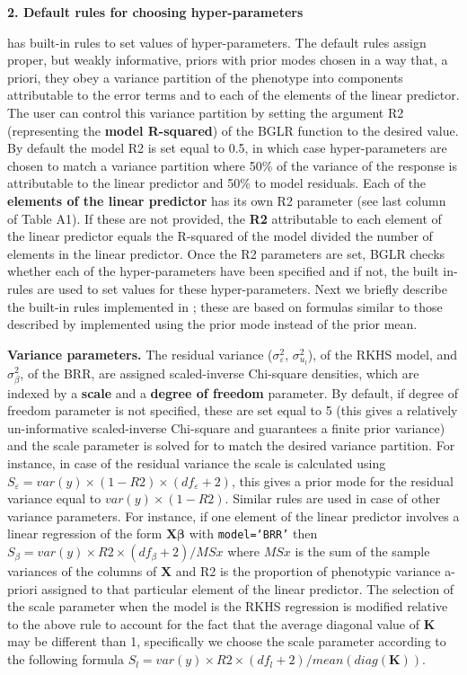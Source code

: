 \documentclass[article,shortnames,nojss]{jss}
\begin{document}
\vspace{0.5cm}
\textbf{2. Default rules for choosing hyper-parameters}
\vspace{0.5cm}

 has built-in rules to set values of hyper-parameters. The 
default rules assign proper, but weakly informative, 
priors with prior modes chosen in a way that, 
a priori, they obey a variance partition of 
the phenotype into components attributable 
to the error terms and to each of the 
elements of the linear predictor.  The user 
can control this variance partition by setting the 
argument R2 (representing the \textbf{model R-squared}) of the 
BGLR function to the desired value. By default the model 
R2 is set equal to 0.5, in which case hyper-parameters 
are chosen to match a variance partition where 50\% of the 
variance of the response is attributable to the linear 
predictor and 50\% to model residuals. Each of the 
\textbf{elements of the linear predictor} has its own R2 parameter 
(see last column of Table A1). If these are not provided, 
the \textbf{R2} attributable to each element of the linear 
predictor equals the R-squared of the model divided 
the number of elements in the linear predictor. Once 
the R2 parameters are set, BGLR checks whether each of the hyper-parameters have been 
specified and if not, the built in-rules are used to set 
values for these hyper-parameters. Next we briefly describe 
the built-in rules implemented in ; these are based
on formulas similar to those described by \citet{delosCampos:2013b} implemented using the prior mode
instead of the prior mean.

\textbf{Variance parameters.} The residual variance ($\sigma_{\varepsilon}^2$, $\sigma_{u_{l}}^2$), 
of the RKHS model, and $\sigma_{\beta}^2$, of the BRR, are assigned scaled-inverse 
Chi-square densities, which are indexed by a \textbf{scale} 
and a \textbf{degree of freedom} parameter. By default, if 
degree of freedom parameter is not specified, these are 
set equal to 5 (this gives a relatively un-informative 
scaled-inverse Chi-square and guarantees a finite 
prior variance) and the scale parameter is solved for
to match the desired variance partition.  For instance, 
in case of the residual variance the scale is calculated using 
$S_\varepsilon=var(y)\times (1-R2) \times (df_\varepsilon+2)$, this gives a prior 
mode for the residual variance equal to $var(y) \times (1-R2)$.
Similar rules are used in case of other variance parameters. 
For instance, if one element of the linear predictor 
involves a linear regression of the form 
$\boldsymbol X \boldsymbol \beta$ with \texttt{model=`BRR'} then
$S_\beta=var(y)\times R2 \times (df_\beta+2)/MSx$ where $MSx$
is the sum of the sample variances of the 
columns of $\boldsymbol X$ and R2 is the proportion of 
phenotypic variance a-priori assigned to that particular element 
of the linear predictor. The selection of the scale parameter 
when the model is the RKHS regression is modified relative 
to the above rule to account for the fact that the average 
diagonal value of $\boldsymbol K$ may be different than 1, 
specifically we choose the scale parameter according 
to the following formula 
$S_l=var(y) \times R2 \times (df_l+2)/mean(diag(\boldsymbol K))$. 
\end{document}
